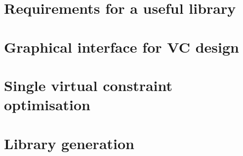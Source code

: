 \section{Requirements for a useful library}


\section{Graphical interface for VC design}


\section{Single virtual constraint optimisation} \label{sec:singleVCopt}


\section{Library generation} \label{sec:lib}
 